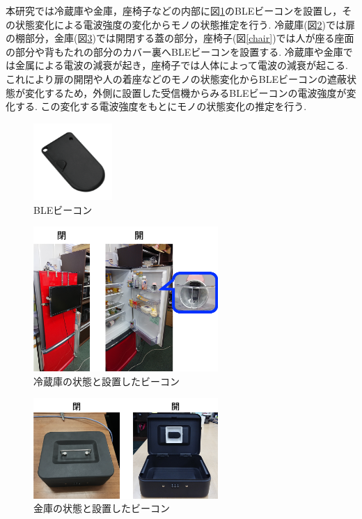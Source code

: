 \documentclass[Japanese]{dicomopapers}
\begin{document}
本研究では冷蔵庫や金庫，座椅子などの内部に図\ref{beacon}のBLEビーコンを設置し，その状態変化による電波強度の変化からモノの状態推定を行う.
冷蔵庫(図\ref{freezer})では扉の棚部分，金庫(図\ref{safe})では開閉する蓋の部分，座椅子(図\ref{chair})では人が座る座面の部分や背もたれの部分のカバー裏へBLEビーコンを設置する.
冷蔵庫や金庫では金属による電波の減衰が起き，座椅子では人体によって電波の減衰が起こる.
これにより扉の開閉や人の着座などのモノの状態変化からBLEビーコンの遮蔽状態が変化するため，外側に設置した受信機からみるBLEビーコンの電波強度が変化する.
この変化する電波強度をもとにモノの状態変化の推定を行う.





\begin{figure}[tbh]
    \centering
    \includegraphics[width=3cm]{ble.png}
    \caption{BLEビーコン}
    \label{beacon}
   \end{figure}

\begin{figure}[tbh]
    \centering
    \includegraphics[width=7cm]{regisW2.png}
    \caption{冷蔵庫の状態と設置したビーコン}
    \label{freezer}
\end{figure}

\begin{figure}[tbh]
    \centering
    \includegraphics[width=7cm]{kinkoW.png}
    \caption{金庫の状態と設置したビーコン}
    \label{safe}
\end{figure}
\end{document}
